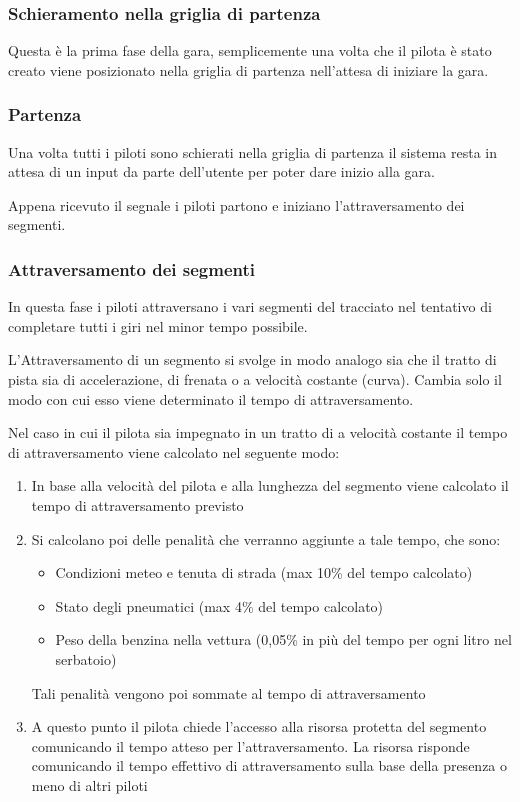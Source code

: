 \documentclass[a4paper,11pt, twoside]{book}
\begin{document}
	\subsubsection{Schieramento nella griglia di partenza}
	  Questa è la prima fase della gara, semplicemente una volta che il pilota è stato creato
	  viene posizionato nella griglia di partenza nell'attesa di iniziare la gara.
	  
	\subsubsection{Partenza}
	
	  Una volta tutti i piloti sono schierati nella griglia di partenza il sistema resta in attesa di un input
	  da parte dell'utente per poter dare inizio alla gara.
	  
	  Appena ricevuto il segnale i piloti partono e iniziano l'attraversamento dei segmenti.
	  
	\subsubsection{Attraversamento dei segmenti}
	\label{AttraversamentoSegmenti}
	  In questa fase i piloti attraversano i vari segmenti del tracciato nel tentativo di completare tutti i giri
	  nel minor tempo possibile.
	  
	  L'Attraversamento di un segmento si svolge in modo analogo sia che il tratto di pista sia
	  di accelerazione, di frenata o a velocità costante (curva). Cambia solo il modo con cui esso viene 
	  determinato il tempo di attraversamento.
	  
	  Nel caso in cui il pilota sia impegnato in un tratto di a velocità costante
	  il tempo di attraversamento viene calcolato nel seguente modo:
	  
	  \begin{enumerate}
	    \item In base alla velocità del pilota e alla lunghezza del segmento viene calcolato il tempo di attraversamento previsto
	    \item Si calcolano poi delle penalità che verranno aggiunte a tale tempo, che sono:
		  \begin{itemize}
		    \item Condizioni meteo e tenuta di strada (max 10\% del tempo calcolato)
		    \item Stato degli pneumatici (max 4\% del tempo calcolato)
		    \item Peso della benzina nella vettura (0,05\% in più del tempo per ogni litro nel serbatoio)
		  \end{itemize}
		  Tali penalità vengono poi sommate al tempo di attraversamento
	    \item A questo punto il pilota chiede l'accesso alla risorsa protetta del segmento
		  comunicando il tempo atteso per l'attraversamento. La risorsa risponde comunicando il tempo
		  effettivo di attraversamento sulla base della presenza o meno di altri piloti
	  \end{enumerate}
	  
\end{document}
